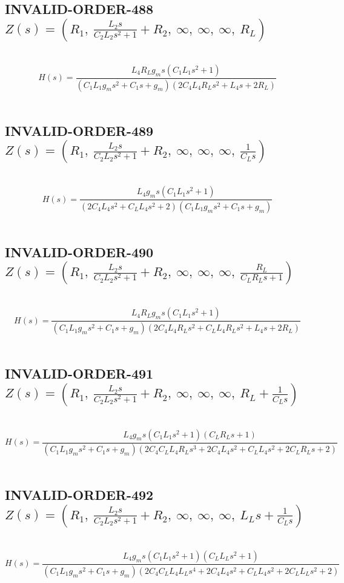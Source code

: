 \documentclass{article}
\begin{document}
\subsection{INVALID-ORDER-488 $Z(s) = \left( R_{1}, \  \frac{L_{2} s}{C_{2} L_{2} s^{2} + 1} + R_{2}, \  \infty, \  \infty, \  \infty, \  R_{L}\right)$ } \ 
\textbf{\[H(s) = \frac{L_{4} R_{L} g_{m} s \left(C_{1} L_{1} s^{2} + 1\right)}{\left(C_{1} L_{1} g_{m} s^{2} + C_{1} s + g_{m}\right) \left(2 C_{4} L_{4} R_{L} s^{2} + L_{4} s + 2 R_{L}\right)}\] } \ 
\subsection{INVALID-ORDER-489 $Z(s) = \left( R_{1}, \  \frac{L_{2} s}{C_{2} L_{2} s^{2} + 1} + R_{2}, \  \infty, \  \infty, \  \infty, \  \frac{1}{C_{L} s}\right)$ } \ 
\textbf{\[H(s) = \frac{L_{4} g_{m} s \left(C_{1} L_{1} s^{2} + 1\right)}{\left(2 C_{4} L_{4} s^{2} + C_{L} L_{4} s^{2} + 2\right) \left(C_{1} L_{1} g_{m} s^{2} + C_{1} s + g_{m}\right)}\] } \ 
\subsection{INVALID-ORDER-490 $Z(s) = \left( R_{1}, \  \frac{L_{2} s}{C_{2} L_{2} s^{2} + 1} + R_{2}, \  \infty, \  \infty, \  \infty, \  \frac{R_{L}}{C_{L} R_{L} s + 1}\right)$ } \ 
\textbf{\[H(s) = \frac{L_{4} R_{L} g_{m} s \left(C_{1} L_{1} s^{2} + 1\right)}{\left(C_{1} L_{1} g_{m} s^{2} + C_{1} s + g_{m}\right) \left(2 C_{4} L_{4} R_{L} s^{2} + C_{L} L_{4} R_{L} s^{2} + L_{4} s + 2 R_{L}\right)}\] } \ 
\subsection{INVALID-ORDER-491 $Z(s) = \left( R_{1}, \  \frac{L_{2} s}{C_{2} L_{2} s^{2} + 1} + R_{2}, \  \infty, \  \infty, \  \infty, \  R_{L} + \frac{1}{C_{L} s}\right)$ } \ 
\textbf{\[H(s) = \frac{L_{4} g_{m} s \left(C_{1} L_{1} s^{2} + 1\right) \left(C_{L} R_{L} s + 1\right)}{\left(C_{1} L_{1} g_{m} s^{2} + C_{1} s + g_{m}\right) \left(2 C_{4} C_{L} L_{4} R_{L} s^{3} + 2 C_{4} L_{4} s^{2} + C_{L} L_{4} s^{2} + 2 C_{L} R_{L} s + 2\right)}\] } \ 
\subsection{INVALID-ORDER-492 $Z(s) = \left( R_{1}, \  \frac{L_{2} s}{C_{2} L_{2} s^{2} + 1} + R_{2}, \  \infty, \  \infty, \  \infty, \  L_{L} s + \frac{1}{C_{L} s}\right)$ } \ 
\textbf{\[H(s) = \frac{L_{4} g_{m} s \left(C_{1} L_{1} s^{2} + 1\right) \left(C_{L} L_{L} s^{2} + 1\right)}{\left(C_{1} L_{1} g_{m} s^{2} + C_{1} s + g_{m}\right) \left(2 C_{4} C_{L} L_{4} L_{L} s^{4} + 2 C_{4} L_{4} s^{2} + C_{L} L_{4} s^{2} + 2 C_{L} L_{L} s^{2} + 2\right)}\] } \ 
\end{document}
